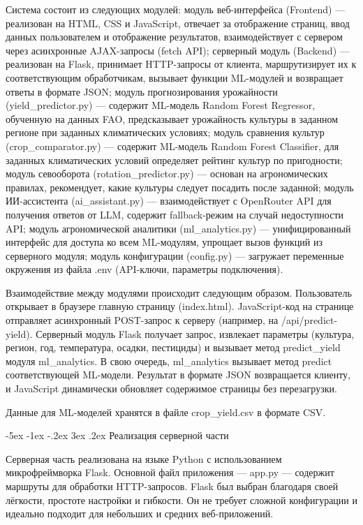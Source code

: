 \documentclass[14pt, a4paper]{extarticle}
\makeatletter
\renewcommand\subsection{\@startsection {subsection}{2}{\z@}%
    {-5ex \@plus -1ex \@minus -.2ex}%
    {3ex \@plus.2ex}%
    {\centering\large\bfseries}}
\makeatother
\begin{document}
    Система состоит из следующих модулей: модуль веб-интерфейса (Frontend) — реализован на HTML, CSS и JavaScript, отвечает за отображение страниц, ввод данных пользователем и отображение результатов, взаимодействует с сервером через асинхронные AJAX-запросы (fetch API); серверный модуль (Backend) — реализован на Flask, принимает HTTP-запросы от клиента, маршрутизирует их к соответствующим обработчикам, вызывает функции ML-модулей и возвращает ответы в формате JSON; модуль прогнозирования урожайности (yield\_predictor.py) — содержит ML-модель Random Forest Regressor, обученную на данных FAO, предсказывает урожайность культуры в заданном регионе при заданных климатических условиях; модуль сравнения культур (crop\_comparator.py) — содержит ML-модель Random Forest Classifier, для заданных климатических условий определяет рейтинг культур по пригодности; модуль севооборота (rotation\_predictor.py) — основан на агрономических правилах, рекомендует, какие культуры следует посадить после заданной; модуль ИИ-ассистента (ai\_assistant.py) — взаимодействует с OpenRouter API для получения ответов от LLM, содержит fallback-режим на случай недоступности API; модуль агрономической аналитики (ml\_analytics.py) — унифицированный интерфейс для доступа ко всем ML-модулям, упрощает вызов функций из серверного модуля; модуль конфигурации (config.py) — загружает переменные окружения из файла .env (API-ключи, параметры подключения).

    Взаимодействие между модулями происходит следующим образом. Пользователь открывает в браузере главную страницу (index.html). JavaScript-код на странице отправляет асинхронный POST-запрос к серверу (например, на /api/predict-yield). Серверный модуль Flask получает запрос, извлекает параметры (культура, регион, год, температура, осадки, пестициды) и вызывает метод predict\_yield модуля ml\_analytics. В свою очередь, ml\_analytics вызывает метод predict соответствующей ML-модели. Результат в формате JSON возвращается клиенту, и JavaScript динамически обновляет содержимое страницы без перезагрузки.

    Данные для ML-моделей хранятся в файле crop\_yield.csv в формате CSV.

\subsection{Реализация серверной части}

    Серверная часть реализована на языке Python с использованием микрофреймворка Flask. Основной файл приложения — app.py — содержит маршруты для обработки HTTP-запросов. Flask был выбран благодаря своей лёгкости, простоте настройки и гибкости. Он не требует сложной конфигурации и идеально подходит для небольших и средних веб-приложений.
\end{document}
